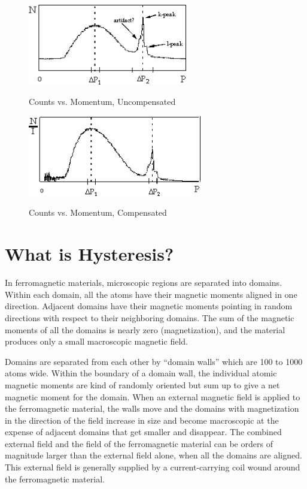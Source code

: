 \documentclass{../lab}
\begin{document}
\begin{figure}[h]
\captionsetup{justification=centering}
\begin{minipage}[t]{.5\textwidth}
    \centering
    \href{http://experimentationlab.berkeley.edu/sites/default/files/images/BRAimage008.gif}{\includegraphics[height=100pt,keepaspectratio]{images/BRAimage008.png}}
    \caption{Counts vs. Momentum, Uncompensated}
    \label{fig:CountsVsMomentumUncompensated}
\end{minipage}
\begin{minipage}[t]{.5\textwidth}
    \centering
    \href{http://experimentationlab.berkeley.edu/sites/default/files/images/BRAimage009.gif}{\includegraphics[height=100pt,keepaspectratio]{images/BRAimage009.png}}
    \caption{Counts vs. Momentum, Compensated}
    \label{fig:CountsVsMomentumCompensated}
\end{minipage}
\end{figure}

\section{What is Hysteresis?}

In ferromagnetic materials, microscopic regions are separated into domains. Within each domain, all the atoms have their magnetic moments aligned in one direction. Adjacent domains have their magnetic moments pointing in random directions with respect to their neighboring domains. The sum of the magnetic moments of all the domains is nearly zero (magnetization), and the material produces only a small macroscopic magnetic field.

Domains are separated from each other by ``domain walls'' which are 100 to 1000 atoms wide. Within the boundary of a domain wall, the individual atomic magnetic moments are kind of randomly oriented but sum up to give a net magnetic moment for the domain. When an external magnetic field is applied to the ferromagnetic material, the walls move and the domains with magnetization in the direction of the field increase in size and become macroscopic at the expense of adjacent domains that get smaller and disappear. The combined external field and the field of the ferromagnetic material can be orders of magnitude larger than the external field alone, when all the domains are aligned. This external field is generally supplied by a current-carrying coil wound around the ferromagnetic material.
\end{document}
